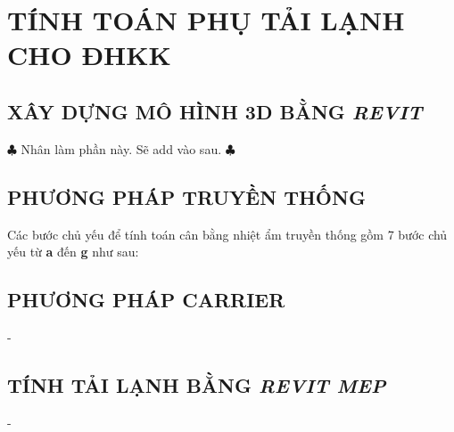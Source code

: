 \newpage
{}

\newpage
\chapter{\textbf{TÍNH TOÁN PHỤ TẢI LẠNH CHO ĐHKK}}
\newpage

\section{XÂY DỰNG MÔ HÌNH 3D BẰNG \emph{REVIT}}
\hspace{1cm}$ \clubsuit $ Nhân làm phần này. Sẽ add vào sau. $ \clubsuit $

\section{PHƯƠNG PHÁP TRUYỀN THỐNG}
\hspace{1cm}Các bước chủ yếu để tính toán cân bằng nhiệt ẩm truyền thống gồm 7 bước chủ yếu từ \textbf{a} đến \textbf{g} như sau:

\section{PHƯƠNG PHÁP CARRIER}
\hspace{1cm}- 

\section{TÍNH TẢI LẠNH BẰNG \emph{REVIT MEP}}
\hspace{1cm}- 


